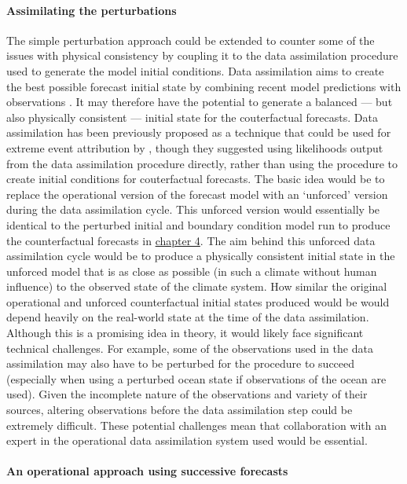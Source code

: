     \paragraph*{Assimilating the perturbations}

      The simple perturbation approach could be extended to counter some of the issues with physical consistency by coupling it to the data assimilation procedure used to generate the model initial conditions. Data assimilation aims to create the best possible forecast initial state by combining recent model predictions with observations \citep{kalman_new_1960}. It may therefore have the potential to generate a balanced --- but also physically consistent --- initial state for the couterfactual forecasts. Data assimilation has been previously proposed as a technique that could be used for extreme event attribution by \citet{hannart_dada_2016}, though they suggested using likelihoods output from the data assimilation procedure directly, rather than using the procedure to create initial conditions for couterfactual forecasts. The basic idea would be to replace the operational version of the forecast model with an `unforced' version during the data assimilation cycle. This unforced version would essentially be identical to the perturbed initial and boundary condition model run to produce the counterfactual forecasts in \hyperref[ch4]{chapter 4}. The aim behind this unforced data assimilation cycle would be to produce a physically consistent initial state in the unforced model that is as close as possible (in such a climate without human influence) to the observed state of the climate system. How similar the original operational and unforced counterfactual initial states produced would be would depend heavily on the real-world state at the time of the data assimilation. Although this is a promising idea in theory, it would likely face significant technical challenges. For example, some of the observations used in the data assimilation may also have to be perturbed for the procedure to succeed (especially when using a perturbed ocean state if observations of the ocean are used). Given the incomplete nature of the observations and variety of their sources, altering observations before the data assimilation step could be extremely difficult. These potential challenges mean that collaboration with an expert in the operational data assimilation system used would be essential.

    \paragraph*{An operational approach using successive forecasts}

